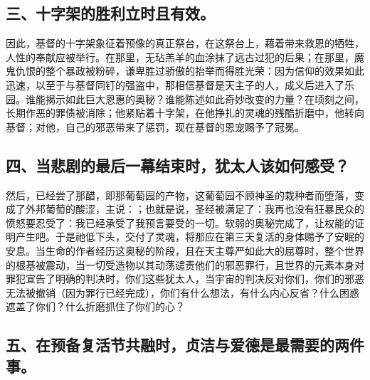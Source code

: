 
\subsection{三、十字架的胜利立时且有效。}

因此，基督的十字架象征着预像的真正祭台，在这祭台上，藉着带来救恩的牺牲，人性的奉献应被举行。在那里，无玷羔羊的血涂抹了远古过犯的后果；在那里，魔鬼仇恨的整个暴政被粉碎，谦卑胜过骄傲的抬举而得胜光荣：因为信仰的效果如此迅速，以至于与基督同钉的强盗中，那相信基督是天主子的人，成义后进入了乐园。谁能揭示如此巨大恩惠的奥秘？谁能陈述如此奇妙改变的力量？在顷刻之间，长期作恶的罪债被消除；他紧贴着十字架，在他挣扎的灵魂的残酷折磨中，他转向基督；对他，自己的邪恶带来了惩罚，现在基督的恩宠赐予了冠冕。\par


\subsection{四、当悲剧的最后一幕结束时，犹太人该如何感受？}

然后，已经尝了那醋，即那葡萄园的产物，这葡萄园不顾神圣的栽种者而堕落，变成了外邦葡萄的酸涩，主说：；也就是说，圣经被满足了：我再也没有狂暴民众的愤怒要忍受了：我已经承受了我预言要受的一切。软弱的奥秘完成了，让权能的证明产生吧。于是祂低下头，交付了灵魂，将那应在第三天复活的身体赐予了安眠的安息。当生命的作者经历这奥秘的阶段，且在天主尊严如此大的屈尊时，整个世界的根基被震动，当一切受造物以其动荡谴责他们的邪恶罪行，且世界的元素本身对罪犯宣告了明确的判决时，你们这些犹太人，当宇宙的判决反对你们，你们的邪恶无法被撤销（因为罪行已经完成），你们有什么想法，有什么内心反省？什么困惑遮盖了你们？什么折磨抓住了你们的心？\par


\subsection{五、在预备复活节共融时，贞洁与爱德是最需要的两件事。}

